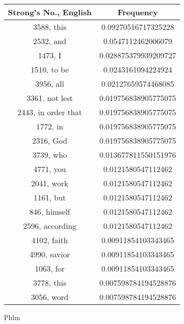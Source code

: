 \documentclass[12pt,letterpaper]{article}
\begin{document}
 \begin{longtable}{|c|c|}
\hline
 Strong's No., English & Frequency \\ \hline  
3588, this & 0.09270516717325228\\ \hline 
 2532, and & 0.0547112462006079\\ \hline 
 1473, I & 0.028875379939209727\\ \hline 
 1510, to be & 0.0243161094224924\\ \hline 
 3956, all & 0.02127659574468085\\ \hline 
 3361, not lest & 0.019756838905775075\\ \hline 
 2443, in order that & 0.019756838905775075\\ \hline 
 1772, in & 0.019756838905775075\\ \hline 
 2316, God & 0.019756838905775075\\ \hline 
 3739, who & 0.013677811550151976\\ \hline 
 4771, you & 0.0121580547112462\\ \hline 
 2041, work & 0.0121580547112462\\ \hline 
 1161, but & 0.0121580547112462\\ \hline 
 846, himself & 0.0121580547112462\\ \hline 
 2596, according & 0.0121580547112462\\ \hline 
 4102, faith & 0.00911854103343465\\ \hline 
 4990, savior & 0.00911854103343465\\ \hline 
 1063, for & 0.00911854103343465\\ \hline 
 3778, this & 0.007598784194528876\\ \hline 
 3056, word & 0.007598784194528876\\ \hline 
\end{longtable} 
 

Phlm
\end{document}
